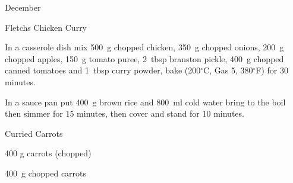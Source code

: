\begin{menu}{December}
\begin{recipe}{2}{Fletchs Chicken Curry}
\begin{ingredients}
		\end{ingredients}
	
	
    \begin{instructions}
    \item 
        In a casserole dish mix
        500~g chopped chicken,
        350~g chopped onions,
        200~g chopped apples,
        150~g  tomato puree,
        2~tbsp  branston pickle,
        400~g chopped canned tomatoes
        and
        1~tbsp  curry powder,
        bake 
      (200$^{\circ}$C, Gas 5, 380$^{\circ}$F)
     for 30 minutes.
      \item 
      In a
      sauce pan
      put
      400~g  brown rice
      and
      800~ml  cold water
      bring to the boil then simmer for 15 minutes,
      then cover and stand for 10 minutes.
    
    \end{instructions}
    \end{recipe}%
  
    \begin{recipe}{2}{Curried Carrots}%
    
		\begin{ingredients}
		400 g carrots (chopped) \\
	
		\end{ingredients}
	
    \begin{instructions}
    \item 400~g chopped carrots
    \end{instructions}
    \end{recipe}%
  
    \clearpage
    \end{menu}
	
	